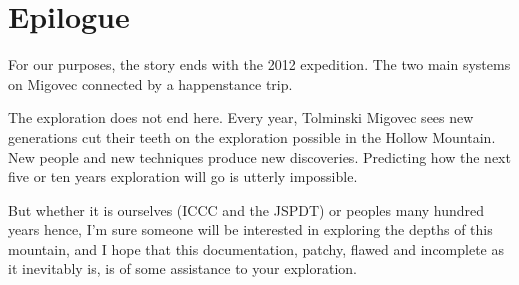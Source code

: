 

\chapter{Epilogue}

For our purposes, the story ends with the 2012 expedition. The two main
systems on Migovec connected by a happenstance trip.

The exploration does not end here. Every year, Tolminski Migovec sees
new generations cut their teeth on the exploration possible in the
Hollow Mountain. New people and new techniques produce new discoveries.
Predicting how the next five or ten years exploration will go is utterly
impossible.

But whether it is ourselves (ICCC and the JSPDT) or peoples many hundred
years hence, I'm sure someone will be interested in exploring the depths
of this mountain, and I hope that this documentation, patchy, flawed and
incomplete as it inevitably is, is of some assistance to your
exploration.
